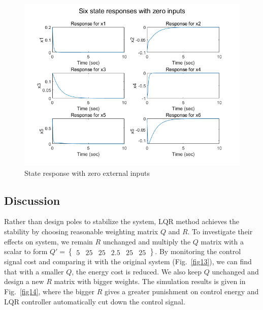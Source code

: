 \documentclass[hyperref]{article}
\theoremstyle{nonumberplain}
\begin{document}
	\begin{figure}[htbp]
		\centering
		\includegraphics[width=0.6\linewidth]{fig16.png}
		\caption{State response with zero external inputs}
		\label{fig12}
	\end{figure}
	
	\subsection{Discussion}
	
	\hspace{1.0em}
	Rather than design poles to stabilize the system, LQR method achieves the stability by choosing reasonable weighting matrix $Q$ and $R$. To investigate their effects on system, we remain $R$ unchanged and multiply the $Q$ matrix with a scalar to form ${Q}'=\begin{Bmatrix}
	5&  25&  25&  2.5&  25& 25
	\end{Bmatrix}$. By monitoring the control signal cost and comparing it with the original system (Fig.~\ref{fig13}), we can find that with a smaller $Q$, the energy cost is reduced. We also keep $Q$ unchanged and design a new $R$ matrix with bigger weights. The simulation results is given in Fig.~\ref{fig14}, where the bigger $R$ gives a greater punishment on control energy and LQR controller automatically cut down the control signal.
	
\end{document}
